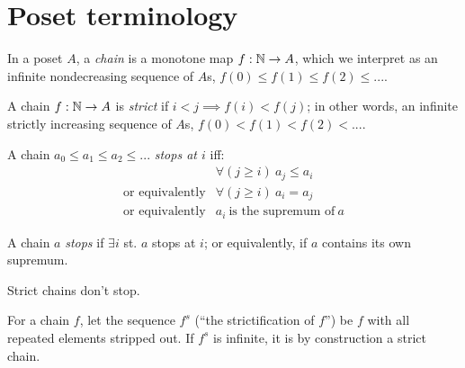 \documentclass{article}
\begin{document}
\section{Poset terminology}

\begin{definition}[Chain]
  In a poset $A$, a \emph{chain} is a monotone map $f : \mathbb{N} \to A$, which we
  interpret as an infinite nondecreasing sequence of $A$s, $f(0) \le f(1) \le
  f(2) \le ...$.
\end{definition}

\begin{definition}
  A chain $f : \mathbb{N} \to A$ is \emph{strict} if $i < j \implies f(i) < f(j)$; in
  other words, an infinite strictly increasing sequence of $A$s, $f(0) < f(1) <
  f(2) < ...$.
\end{definition}

\begin{definition}[Stops-at]
  A chain $a_0 \le a_1 \le a_2 \le ...$ \emph{stops at $i$} iff:
  \[
  \begin{array}{rl}
    & \forall(j \ge i)\ a_j \le a_i\\
    \text{or equivalently} & \forall(j \ge i)\ a_i = a_j\\
    \text{or equivalently} & a_i ~\text{is the supremum of}~a
  \end{array}
  \]
\end{definition}

\begin{definition}[Stops]
  A chain $a$ \emph{stops} if $\exists i$ st. $a$ stops at $i$; or equivalently,
  if $a$ contains its own supremum.
\end{definition}

\begin{observation} Strict chains don't stop. \end{observation}

\begin{definition}
  For a chain $f$, let the sequence $f^s$ (``the strictification of $f$'') be
  $f$ with all repeated elements stripped out. If $f^s$ is infinite, it is by
  construction a strict chain.
\end{definition}

\end{document}
